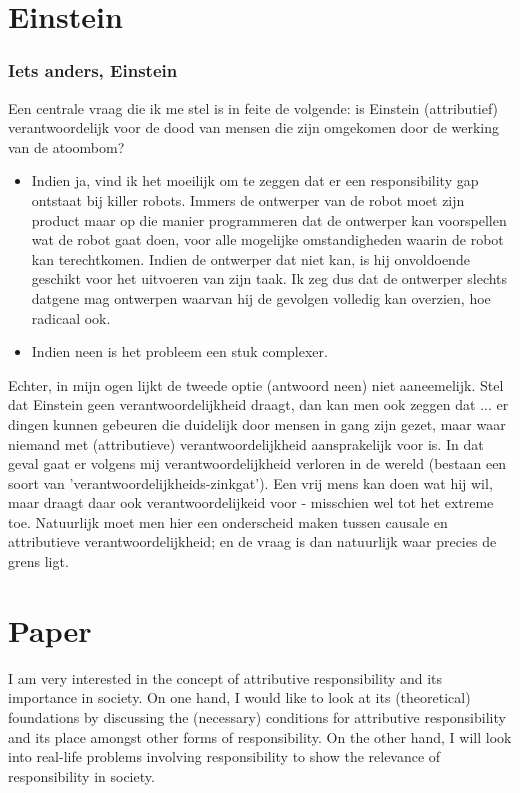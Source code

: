 \documentclass[../main/main.tex]{subfiles}
\begin{document}
\part{Einstein}
\section{Iets anders, Einstein}
Een centrale vraag die ik me stel is in feite de volgende: is Einstein (attributief) verantwoordelijk voor de dood van mensen die zijn omgekomen door de werking van de atoombom?
\begin{itemize}
\item Indien ja, vind ik het moeilijk om te zeggen dat er een responsibility gap ontstaat bij killer robots. Immers de ontwerper van de robot moet zijn product maar op die manier programmeren dat de ontwerper kan voorspellen wat de robot gaat doen, voor alle mogelijke omstandigheden waarin de robot kan terechtkomen. Indien de ontwerper dat niet kan, is hij onvoldoende geschikt voor het uitvoeren van zijn taak. Ik zeg dus dat de ontwerper slechts datgene mag ontwerpen waarvan hij de gevolgen volledig kan overzien, hoe radicaal ook.
\item Indien neen is het probleem een stuk complexer.
\end{itemize}


Echter, in mijn ogen lijkt de tweede optie (antwoord neen) niet aaneemelijk. Stel dat Einstein geen verantwoordelijkheid draagt, dan kan men ook zeggen dat ... er dingen kunnen gebeuren die duidelijk door mensen in gang zijn gezet, maar waar niemand met (attributieve) verantwoordelijkheid aansprakelijk voor is. In dat geval gaat er volgens mij verantwoordelijkheid verloren in de wereld (bestaan een soort van 'verantwoordelijkheids-zinkgat'). Een vrij mens kan doen wat hij wil, maar draagt daar ook verantwoordelijkeid voor - misschien wel tot het extreme toe. Natuurlijk moet men hier een onderscheid maken tussen causale en attributieve verantwoordelijkheid; en de vraag is dan natuurlijk waar precies de grens ligt. 

\newpage
\part{Paper}
I am very interested in the concept of attributive responsibility and its importance in society. On one hand, I would like to look at its (theoretical) foundations by discussing the (necessary) conditions for attributive responsibility and its place amongst other forms of responsibility. On the other hand, I will look into real-life problems involving responsibility to show the relevance of responsibility in society. 
\end{document}
